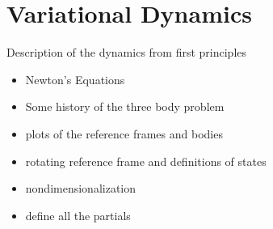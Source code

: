 \section{Variational Dynamics}
Description of the dynamics from first principles
\begin{itemize}
	\item Newton's Equations
	\item Some history of the three body problem
	\item plots of the reference frames and bodies
	\item rotating reference frame and definitions of states
	\item nondimensionalization
	\item define all the partials
\end{itemize}

